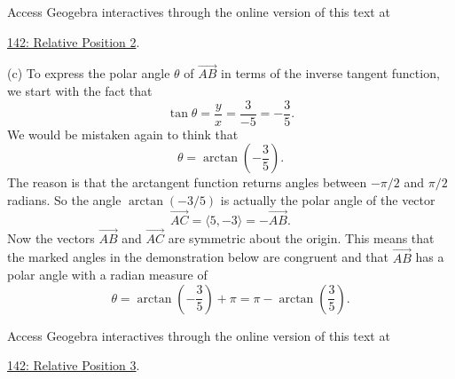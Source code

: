 \documentclass{ximera}
\begin{document}
\begin{example}
\begin{explanation}
\begin{exploration} 
\begin{onlineOnly}
    \begin{center}
\end{center}
\end{onlineOnly}

Access Geogebra interactives through the online version of this text at
 
\href{https://www.geogebra.org/classic/da2q3jgv}{142: Relative Position 2}.
\end{exploration}

(c) To express the polar angle $\theta$ of $\overrightarrow{AB}$ in terms of the inverse tangent function, we start with the fact that
\[
   \tan\theta  = \frac{y}{x} = \frac{3}{-5} = -\frac{3}{5} .
\]
We would be mistaken again to think that 
\[
   \theta = \arctan \left(  -\frac{3}{5}  \right) .
\]
The reason is that the arctangent function returns angles between $-\pi/2$ and $\pi/2$ radians. So the angle $\arctan(-3/5)$ is actually the polar angle of the vector
\[
   \overrightarrow{AC} = \langle 5, -3 \rangle = - \overrightarrow{AB}.
\]
Now the vectors $\overrightarrow{AB}$ and $\overrightarrow{AC}$ are symmetric about the origin. This means that the marked angles in the demonstration below are congruent and that $\overrightarrow{AB}$ has a polar angle with a radian measure of 
\[
   \theta = \arctan  \left( - \frac{3}{5}  \right) + \pi  = \pi - \arctan  \left( \frac{3}{5}  \right).
\] 

\begin{exploration} 
\begin{onlineOnly}
    \begin{center}
\end{center}
\end{onlineOnly}

Access Geogebra interactives through the online version of this text at
 
\href{https://www.geogebra.org/classic/wh4eu7n8}{142: Relative Position 3}.
\end{exploration}


\end{explanation}

\end{example}
\end{document}
